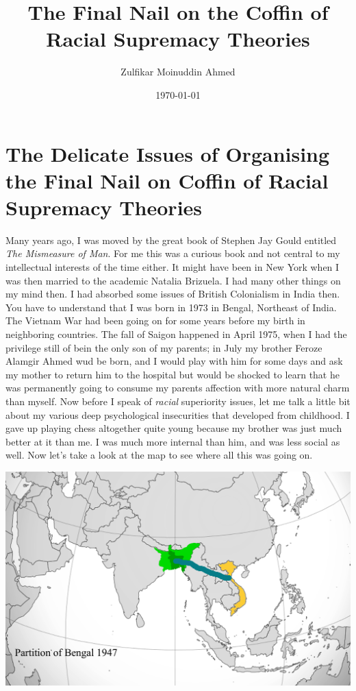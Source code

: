 \documentclass{amsart}
\title{The Final Nail on the Coffin of Racial Supremacy Theories}
\author{Zulfikar Moinuddin Ahmed}
\date{\today}
\begin{document}
\maketitle

\section{The Delicate Issues of Organising the Final Nail on Coffin of Racial Supremacy Theories}

Many years ago, I was moved by the great book of Stephen Jay Gould entitled {\em The Mismeasure of Man}.  For me this was a curious book and not central to my intellectual interests of the time either.  It might have been in New York when I was then married to the academic Natalia Brizuela.  I had many other things on my mind then.  I had absorbed some issues of British Colonialism in India then.  You have to understand that I was born in 1973 in Bengal, Northeast of India.  The Vietnam War had been going on for some years before my birth in neighboring countries.  The fall of Saigon happened in April 1975, when I had the privilege still of bein the only son of my parents;  in July my brother Feroze Alamgir Ahmed wud be born, and I would play with him for some days and ask my mother to return him to the hospital but would be shocked to learn that he was permanently going to consume my parents affection with more natural charm than myself.  Now before I speak of {\em racial} superiority issues, let me talk a little bit about my various deep psychological insecurities that developed from childhood.  I gave up playing chess altogether quite young because my brother was just much better at it than me.  I was much more internal than him, and was less social as well.  Now let's take a look at the map to see where all this was going on.

\includegraphics[scale=0.1]{bengal2.png}
\end{document}
